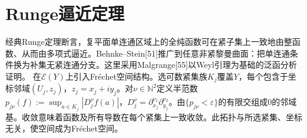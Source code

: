 \section{Runge逼近定理}
经典Runge定理断言，复平面单连通区域上的全纯函数可在紧子集上一致地由整函数、从而由多项式逼近。Behnke--Stein[51]推广到任意非紧黎曼曲面：把单连通条件换为补集无紧连通分支。这里采用Malgrange[55]以Weyl引理为基础的泛函分析证明。
在$\mathcal E(Y)$上引入Fréchet空间结构。选可数紧集族$K_j$覆盖$Y$，每个包含于坐标邻域$(U_j,z_j)$，$z_j=x_j+iy_j$。对$\nu\in\mathbb N^2$定义半范数$p_{j\nu}(f):=\sup_{a\in K_j}|D_j^\nu f(a)|$，$D_j^\nu=\partial_{x_j}^{\nu_1}\partial_{y_j}^{\nu_2}$。由$\{p_{j\nu}<\varepsilon\}$的有限交组成0的邻域基。收敛意味着函数及所有导数在每个紧集上一致收敛。此拓扑与所选紧集、坐标无关，使空间成为Fréchet空间。

